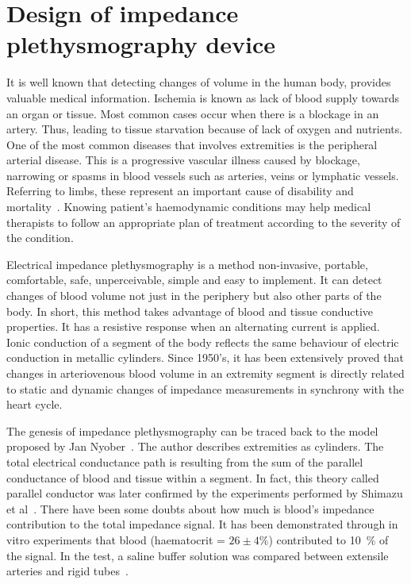 
\chapter{Design of impedance plethysmography device}
\label{chapter3}

\ifpdf
    \graphicspath{{Chapter3/Figs/Raster/}{Chapter3/Figs/PDF/}{Chapter3/Figs/}}
\else
    \graphicspath{{Chapter3/Figs/Vector/}{Chapter3/Figs/}}
\fi


It is well known that detecting changes of volume in the human body, provides valuable medical information. Ischemia is known as lack of blood supply towards an organ or tissue. Most common cases occur when there is a blockage in an artery. Thus, leading to tissue starvation because of lack of oxygen and nutrients. One of the most common diseases that involves extremities is the peripheral arterial disease. This is a progressive vascular illness caused by blockage, narrowing or spasms in blood vessels such as arteries, veins or lymphatic vessels. Referring to limbs, these represent an important cause of disability and mortality~\cite{novo1995patients}. Knowing patient's haemodynamic conditions may help medical therapists to follow an appropriate plan of treatment according to the severity of the condition.

Electrical impedance plethysmography is a method non-invasive, portable, comfortable, safe, unperceivable, simple and easy to implement.  It can detect changes of blood volume not just in the periphery but also other parts of the body. In short, this method takes advantage of blood and tissue conductive properties. It has a resistive response when an alternating current is applied. Ionic conduction of a segment of the body reflects the same behaviour of electric conduction in metallic cylinders. Since 1950's, it has been extensively proved that changes in arteriovenous blood volume in an extremity segment is directly related to static and dynamic changes of impedance measurements in synchrony with the heart cycle.

The genesis of impedance plethysmography can be traced back to the model proposed by Jan Nyober~\cite{nyober1959electrical}. The author describes extremities as cylinders. The total electrical conductance path is resulting from the sum of the parallel conductance of blood and tissue within a segment. In fact, this theory called parallel conductor was later confirmed by the experiments performed by Shimazu et al~\cite{shimazu1982evaluation}. There have been some doubts about how much is blood's impedance contribution to the total impedance signal.  It has been demonstrated through in vitro experiments that blood (haematocrit = $ 26 \pm 4 \%$) contributed to \SI{10}{\percent} of the signal. In the test, a saline buffer solution was compared between extensile arteries and rigid tubes~\cite{peura1978influence}. 

